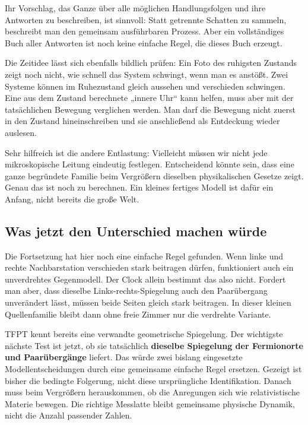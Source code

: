 \documentclass[
  ngerman,
  10pt,
  a4paper,
]{article}
\begin{document}
Ihr Vorschlag, das Ganze über alle möglichen Handlungsfolgen und ihre
Antworten zu beschreiben, ist sinnvoll: Statt getrennte Schatten zu
sammeln, beschreibt man den gemeinsam ausführbaren Prozess. Aber ein
vollständiges Buch aller Antworten ist noch keine einfache Regel, die
dieses Buch erzeugt.

Die Zeitidee lässt sich ebenfalls bildlich prüfen: Ein Foto des
ruhigsten Zustands zeigt noch nicht, wie schnell das System schwingt,
wenn man es anstößt. Zwei Systeme können im Ruhezustand gleich aussehen
und verschieden schwingen. Eine aus dem Zustand berechnete „innere Uhr``
kann helfen, muss aber mit der tatsächlichen Bewegung verglichen werden.
Man darf die Bewegung nicht zuerst in den Zustand hineinschreiben und
sie anschließend als Entdeckung wieder auslesen.

Sehr hilfreich ist die andere Entlastung: Vielleicht müssen wir nicht
jede mikroskopische Leitung eindeutig festlegen. Entscheidend könnte
sein, dass eine ganze begründete Familie beim Vergrößern dieselben
physikalischen Gesetze zeigt. Genau das ist noch zu berechnen. Ein
kleines fertiges Modell ist dafür ein Anfang, nicht bereits die große
Welt.

\subsection{Was jetzt den Unterschied machen
würde}\label{was-jetzt-den-unterschied-machen-wuxfcrde}

Die Fortsetzung hat hier noch eine einfache Regel gefunden. Wenn linke
und rechte Nachbarstation verschieden stark beitragen dürfen,
funktioniert auch ein unverdrehtes Gegenmodell. Der Clock allein
bestimmt das also nicht. Fordert man aber, dass dieselbe
Links-rechts-Spiegelung auch den Paarübergang unverändert lässt, müssen
beide Seiten gleich stark beitragen. In dieser kleinen Quellenfamilie
bleibt dann ohne freie Zimmer nur die verdrehte Variante.

TFPT kennt bereits eine verwandte geometrische Spiegelung. Der
wichtigste nächste Test ist jetzt, ob sie tatsächlich \textbf{dieselbe
Spiegelung der Fermionorte und Paarübergänge} liefert. Das würde zwei
bislang eingesetzte Modellentscheidungen durch eine gemeinsame einfache
Regel ersetzen. Gezeigt ist bisher die bedingte Folgerung, nicht diese
ursprüngliche Identifikation. Danach muss beim Vergrößern herauskommen,
ob die Anregungen sich wie relativistische Materie bewegen. Die richtige
Messlatte bleibt gemeinsame physische Dynamik, nicht die Anzahl
passender Zahlen.
\end{document}
